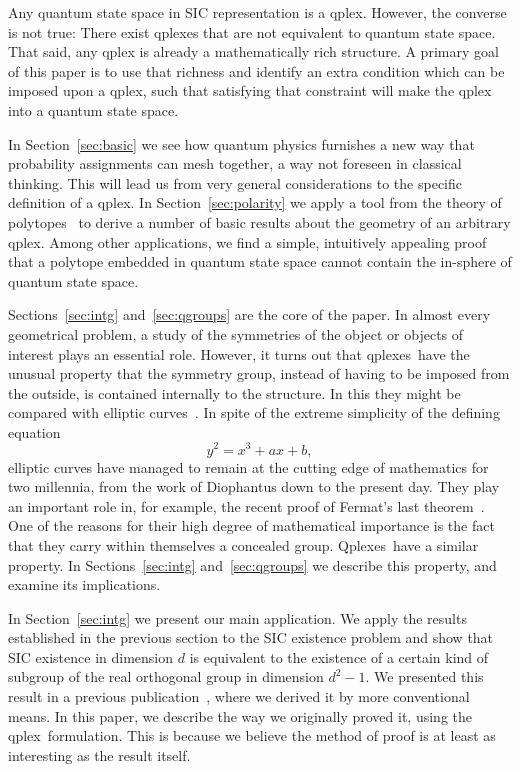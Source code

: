 \documentclass[aps,pra,superscriptaddress,10pt,tightenlines,twocolumn,nofootinbib]{revtex4}
\theoremstyle{remark}
\newcommand{\be}{\begin{equation}}
\newcommand{\ee}{\end{equation}}
\newcommand{\qplex}{qplex}
\newcommand{\qplexes}{qplexes}
\newcommand{\Qplexes}{Qplexes}
\begin{document}
Any quantum state space in SIC representation is a qplex.  However, the converse is not true:  There exist qplexes that are not equivalent to quantum state space.  That said, any qplex is already a mathematically rich structure.  A primary goal of this paper is to use that richness and identify an extra condition which can be imposed upon a qplex, such that satisfying that constraint will make the qplex into a quantum state space.

In Section~\ref{sec:basic} we see how quantum physics furnishes a new way that probability assignments can mesh together, a way not foreseen in classical thinking.  This will lead us from very general considerations to the specific definition of a qplex. In Section~\ref{sec:polarity} we apply a tool from the theory of polytopes~\cite{grun,zieg} to derive a number of basic results about the geometry of an arbitrary \qplex.  Among other applications, we find a simple, intuitively appealing proof that a polytope embedded in quantum state space cannot contain the in-sphere of quantum state space.

Sections~\ref{sec:intg} and~\ref{sec:qgroups} are the core of the paper.   In almost every geometrical problem, a study of the symmetries of the object or objects of interest plays an essential role.  However, it turns out that \qplexes\ have the unusual property that the symmetry group, instead of having to be imposed from the outside, is contained internally to the structure.  In this they might be compared with elliptic curves~\cite{elliptic3}.  In spite of the extreme simplicity of the defining equation
\be
y^2 = x^3 + a x + b,
\ee
elliptic curves have managed to remain at the cutting edge of mathematics for two millennia, from the work of Diophantus down to the present day. They play an important role in, for example, the recent proof of Fermat's last theorem~\cite{wiles}. One of the reasons for their high degree of mathematical importance is the fact that they carry within themselves a concealed group.  \Qplexes\ have a similar property.  In Sections~\ref{sec:intg} and~\ref{sec:qgroups} we describe this property, and examine its implications.

In Section~\ref{sec:intg} we present our main application.  We apply the results established in the previous section to the SIC existence problem and show that SIC existence in dimension $d$ is equivalent to the existence of a certain kind of subgroup of the real orthogonal group in dimension $d^2-1$.  We  presented this result in a previous publication~\cite{GroupAlg}, where we derived it by more conventional means.  In this paper, we describe the way we originally proved it, using the \qplex\ formulation.  This is because we believe the method of proof is at least as interesting as the result itself.  %
\end{document}
